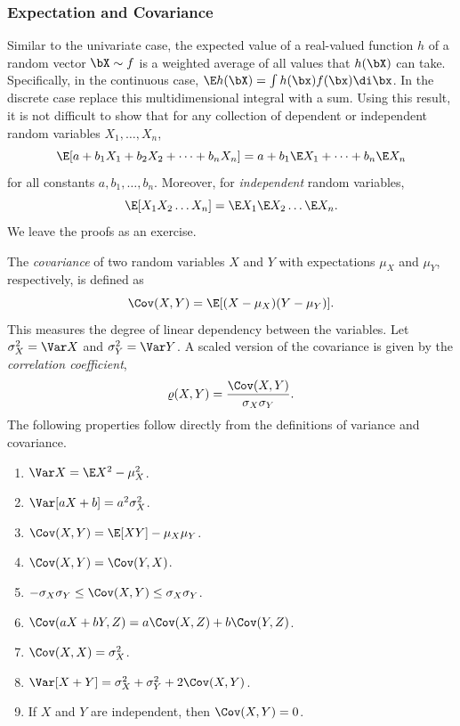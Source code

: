 \subsubsection{Expectation and Covariance}
Similar to the univariate case, the expected value of a real-valued function \(h\) of a random vector \(\bX \sim f\) is a weighted average of all values that \(h(\bX)\) can take. Specifically, in the continuous case, \(\E h(\bX) = \int h(\bx)f(\bx)\di \bx\). In the discrete case replace this multidimensional integral with a sum. Using this result, it is not difficult to show that for any collection of dependent or independent random variables \(X_1, \dots, X_n\),
\begin{equation}
	\label{LinearityOfExpectation}
	\E[a + b_1 X_1 + b_2 X_2 + \dots + b_n X_n] = a + b_1 \E X_1 + \dots + b_n \E X_n
\end{equation}
for all constants \(a, b_1, \dots, b_n\). Moreover, for \textit{independent} random variables,
\begin{equation}
	\label{ExpectationIndependence}
	\E[X_1 X_2 \dots X_n] = \E X_1 \E X_2 \dots \E X_n.
\end{equation}
We leave the proofs as an exercise.

The \textit{covariance} of two random variables \(X\) and \(Y\) with expectations \(\mu_X\) and \(\mu_Y\), respectively, is defined as
\begin{equation}
	\label{CovarianceDefinition}
	\Cov(X, Y) = \E[(X - \mu_X)(Y - \mu_Y)].
\end{equation}
This measures the degree of linear dependency between the variables. Let \(\sigma_X^2 = \Var X\) and \(\sigma_Y^2 = \Var Y\). A scaled version of the covariance is given by the \textit{correlation coefficient},
\begin{equation}
	\label{CorrelationDefinition}
	\varrho(X, Y) = \frac{\Cov(X, Y)}{\sigma_X \sigma_Y}.
\end{equation}
The following properties follow directly from the definitions of variance and covariance.

\begin{enumerate}[1.]
	\item \(\Var X = \E X^2 - \mu_X^2\).
	\item \(\Var[aX + b] = a^2 \sigma_X^2\).
	\item \(\Cov(X, Y) = \E[XY] - \mu_X \mu_Y\).
	\item \(\Cov(X, Y) = \Cov(Y, X)\).
	\item \(-\sigma_X \sigma_Y \le \Cov(X, Y) \le \sigma_X \sigma_Y\).
	\item \(\Cov(aX + bY, Z) = a \Cov(X, Z) + b \Cov(Y, Z)\).
	\item \(\Cov(X, X) = \sigma_X^2\).
	\item \(\Var[X + Y] = \sigma_X^2 + \sigma_Y^2 + 2 \Cov(X, Y)\).
	\item If \(X\) and \(Y\) are independent, then \(\Cov(X, Y) = 0\).
\end{enumerate}

